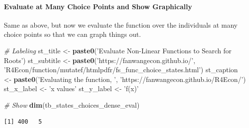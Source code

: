 \documentclass[
]{book}
\newenvironment{Shaded}{\begin{snugshade}}{\end{snugshade}}
\newcommand{\CommentTok}[1]{\textcolor[rgb]{0.56,0.35,0.01}{\textit{#1}}}
\newcommand{\DataTypeTok}[1]{\textcolor[rgb]{0.13,0.29,0.53}{#1}}
\newcommand{\KeywordTok}[1]{\textcolor[rgb]{0.13,0.29,0.53}{\textbf{#1}}}
\newcommand{\NormalTok}[1]{#1}
\newcommand{\OperatorTok}[1]{\textcolor[rgb]{0.81,0.36,0.00}{\textbf{#1}}}
\newcommand{\StringTok}[1]{\textcolor[rgb]{0.31,0.60,0.02}{#1}}
\begin{document}
\hypertarget{evaluate-at-many-choice-points-and-show-graphically}{%
\paragraph{Evaluate at Many Choice Points and Show Graphically}\label{evaluate-at-many-choice-points-and-show-graphically}}

Same as above, but now we evaluate the function over the individuals at many choice points so that we can graph things out.

\begin{Shaded}
\end{Shaded}

\begin{Shaded}
\begin{Highlighting}[]
\CommentTok{# Labeling}
\NormalTok{st_title <-}\StringTok{ }\KeywordTok{paste0}\NormalTok{(}\StringTok{'Evaluate Non-Linear Functions to Search for Roots'}\NormalTok{)}
\NormalTok{st_subtitle <-}\StringTok{ }\KeywordTok{paste0}\NormalTok{(}\StringTok{'https://fanwangecon.github.io/'}\NormalTok{,}
                      \StringTok{'R4Econ/function/mutatef/htmlpdfr/fs_func_choice_states.html'}\NormalTok{)}
\NormalTok{st_caption <-}\StringTok{ }\KeywordTok{paste0}\NormalTok{(}\StringTok{'Evaluating the function, '}\NormalTok{,}
                     \StringTok{'https://fanwangecon.github.io/R4Econ/'}\NormalTok{)}
\NormalTok{st_x_label <-}\StringTok{ 'x values'}
\NormalTok{st_y_label <-}\StringTok{ 'f(x)'}

\CommentTok{# Show}
\KeywordTok{dim}\NormalTok{(tb_states_choices_dense_eval)}
\end{Highlighting}
\end{Shaded}

\begin{verbatim}
[1] 400   5
\end{verbatim}
\end{document}

